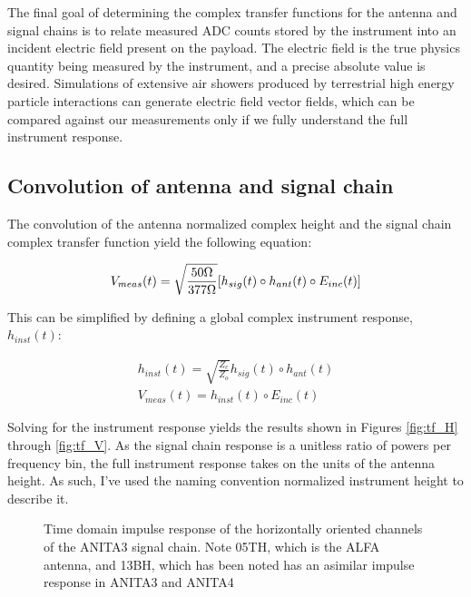	The final goal of determining the complex transfer functions for the antenna and signal chains is to relate measured ADC counts stored by the instrument into an incident electric field present on the payload.  The electric field is the true physics quantity being measured by the instrument, and a precise absolute value is desired.  Simulations of extensive air showers produced by terrestrial high energy particle interactions can generate electric field vector fields, which can be compared against our measurements only if we fully understand the full instrument response.
	
	\subsection{Convolution of antenna and signal chain}
		The convolution of the antenna normalized complex height and the signal chain complex transfer function yield the following equation:
		
\begin{equation}
V_{meas}(t) = \sqrt{\frac{50\Omega}{377\Omega}} [h_{sig}(t) \circ h_{ant}(t) \circ E_{inc}(t)] \\
\label{eqn:fullConvolution}
\end{equation}

This can be simplified by defining a global complex instrument response, $h_{inst}(t)$:

\begin{equation}
\begin{split}
h_{inst}(t) = \sqrt{\frac{Z_{c}}{Z_{o}}}h_{sig}(t) \circ h_{ant}(t) \\ 
V_{meas}(t) = h_{inst}(t) \circ E_{inc}(t)
\end{split}
\label{eqn:instTF}
\end{equation}

Solving for the instrument response yields the results shown in Figures \ref{fig:tf_H} through \ref{fig:tf_V}.  As the signal chain response is a unitless ratio of powers per frequency bin, the full instrument response takes on the units of the antenna height.  As such, I've used the naming convention normalized instrument height to describe it.

		
\begin{figure}
\centering
{}
	\caption{Time domain impulse response of the horizontally oriented channels of the ANITA3 signal chain.  Note 05TH, which is the ALFA antenna, and 13BH, which has been noted has an asimilar impulse response in ANITA3 and ANITA4}
\label{fig:tf_timeH}
\end{figure}

